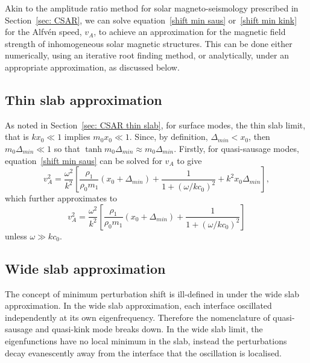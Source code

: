\documentclass[namedreferences]{solarphysics}
\numberwithin{equation}{section}
\begin{document}
\begin{article}
Akin to the amplitude ratio method for solar magneto-seismology prescribed in Section~\ref{sec: CSAR}, we can solve equation~\eqref{shift min saus} or~\eqref{shift min kink} for the Alfv\'{e}n speed, $v_A$, to achieve an approximation for the magnetic field strength of inhomogeneous solar magnetic structures. This can be done either numerically, using an iterative root finding method, or analytically, under an appropriate approximation, as discussed below.


\subsection{Thin slab approximation}
As noted in Section~\ref{sec: CSAR thin slab}, for surface modes, the thin slab limit, that is $kx_0 \ll 1$ implies $m_0x_0 \ll 1$. Since, by definition, $\Delta_{min} < x_0$, then $m_0\Delta_{min} \ll 1$ so that $\tanh{m_0\Delta_{min}} \approx m_0\Delta_{min}$. Firstly, for quasi-sausage modes, equation~\eqref{shift min saus} can be solved for $v_A$ to give
\begin{equation}
v_A^2 = \frac{\omega^2}{k^2} \left[\frac{\rho_1}{\rho_0m_1}(x_0 + \Delta_{min}) + \frac{1}{1 + (\omega / kc_0)^2} + k^2x_0\Delta_{min}\right],
\end{equation}
which further approximates to 
\begin{equation}
v_A^2 = \frac{\omega^2}{k^2} \left[\frac{\rho_1}{\rho_0m_1}(x_0 + \Delta_{min}) + \frac{1}{1 + (\omega / kc_0)^2}\right]
\end{equation}
unless $\omega \gg kc_0$.


\subsection{Wide slab approximation}
The concept of minimum perturbation shift is ill-defined in under the wide slab approximation. In the wide slab approximation, each interface oscillated independently at its own eigenfrequency. Therefore the nomenclature of quasi-sausage and quasi-kink mode breaks down. In the wide slab limit, the eigenfunctions have no local minimum in the slab, instead the perturbations decay evanescently away from the interface that the oscillation is localised.



\end{article}
\end{document}
